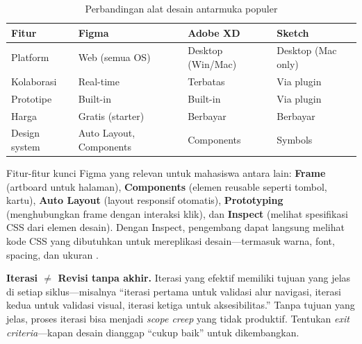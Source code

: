 \begin{table}[H]
\centering
\begin{tabular}{|P{3cm}|P{3cm}|P{3cm}|P{3cm}|}
\hline
\textbf{Fitur} & \textbf{Figma} & \textbf{Adobe XD} & \textbf{Sketch} \\
\hline
Platform & Web (semua OS) & Desktop (Win/Mac) & Desktop (Mac only) \\
\hline
Kolaborasi & Real-time & Terbatas & Via plugin \\
\hline
Prototipe & Built-in & Built-in & Via plugin \\
\hline
Harga & Gratis (starter) & Berbayar & Berbayar \\
\hline
Design system & Auto Layout, Components & Components & Symbols \\
\hline
\end{tabular}
\caption{Perbandingan alat desain antarmuka populer}
\end{table}

Fitur-fitur kunci Figma yang relevan untuk mahasiswa antara lain: \textbf{Frame} (artboard untuk halaman), \textbf{Components} (elemen reusable seperti tombol, kartu), \textbf{Auto Layout} (layout responsif otomatis), \textbf{Prototyping} (menghubungkan frame dengan interaksi klik), dan \textbf{Inspect} (melihat spesifikasi CSS dari elemen desain). Dengan Inspect, pengembang dapat langsung melihat kode CSS yang dibutuhkan untuk mereplikasi desain---termasuk warna, font, spacing, dan ukuran \cite{figmaDocs}.

\begin{konsep}
\textbf{Iterasi $\neq$ Revisi tanpa akhir.} Iterasi yang efektif memiliki tujuan yang jelas di setiap siklus---misalnya ``iterasi pertama untuk validasi alur navigasi, iterasi kedua untuk validasi visual, iterasi ketiga untuk aksesibilitas.'' Tanpa tujuan yang jelas, proses iterasi bisa menjadi \textit{scope creep} yang tidak produktif. Tentukan \textit{exit criteria}---kapan desain dianggap ``cukup baik'' untuk dikembangkan.
\end{konsep}
